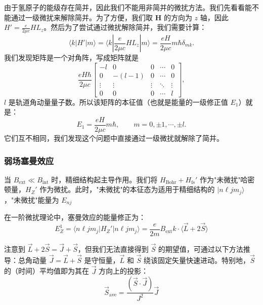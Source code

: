 由于氢原子的能级存在简并，因此我们不能用非简并的微扰方法。我们先看看能不能通过一级微扰来解除简并。为了方便，我们取 $\boldsymbol{H}$ 的方向为 $z$ 轴，因此 $H'=\frac{e}{2\mu c}H L_{z}$。然后为了尝试通过微扰解除简并，我们需要计算：
\begin{equation}
	\langle k|H'|m\rangle = \langle k|\frac{e}{2\mu c}H L_z|m\rangle = \frac{eH}{2\mu c} m\hbar \delta_{mk}.
\end{equation}
我们发现矩阵是一个对角阵，写成矩阵就是
\begin{equation}
	\frac{eH\hbar}{2\mu c}
	\begin{bmatrix}
		-l & 0 & 0 & \cdots & 0 \\
		0 & -(l-1) & 0 & \cdots & 0 \\
		\vdots & \vdots & \vdots & \ddots & \vdots \\
		0 & 0 & 0 & \cdots & l
	\end{bmatrix},
\end{equation}
$l$ 是轨道角动量量子数。所以该矩阵的本征值（也就是能量的一级修正值 $E_{1}$）就是：
\begin{equation}
	E_{1} = \frac{eH}{2\mu c} m\hbar, \qquad m=0,\pm 1,\cdots,\pm l.
\end{equation}
它们互不相同，我们发现这个问题中直接通过一级微扰就解除了简并。

\subsubsection{弱场塞曼效应}

当 \( B_{\text{ext}} \ll B_{\text{int}} \) 时，精细结构起主导作用。我们将 \( H_{\text{Bohr}} + H_{\text{fs}}' \) 作为"未微扰"哈密顿量，\( H_Z' \) 作为微扰。此时，"未微扰"的本征态为适用于精细结构的 \( |n\ell j m_j\rangle \)，"未微扰"能量为 \( E_{nj} \)

在一阶微扰理论中，塞曼效应的能量修正为：
\begin{equation}
	E_Z^1 = \langle n\ell j m_j | H_Z' | n\ell j m_j \rangle = \frac{e}{2m} B_{\text{ext}} \hat{k} \cdot \langle \vec{L} + 2\vec{S} \rangle
\end{equation}

注意到 \( \vec{L} + 2\vec{S} = \vec{J} + \vec{S} \)，但我们无法直接得到 \( \vec{S} \) 的期望值，可通过以下方法推导：总角动量 \( \vec{J} = \vec{L} + \vec{S} \) 是守恒量，\( \vec{L} \) 和 \( \vec{S} \) 绕该固定矢量快速进动。特别地，\( \vec{S} \) 的（时间）平均值即为其在 \( \vec{J} \) 方向上的投影：
\begin{equation}\boxed{
		\vec{S}_{\text{ave}} = \frac{(\vec{S} \cdot \vec{J})}{J^2} \vec{J}
	}
\end{equation}


